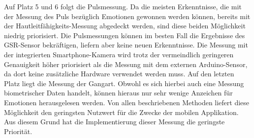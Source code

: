Auf Platz 5 und 6 folgt die Pulsmessung. Da die meisten Erkenntnisse, die mit der Messung des Puls bezüglich Emotionen gewonnen werden können, bereits mit der Hautleitfähigkeits-Messung abgedeckt werden, sind diese beiden Möglichkeit niedrig priorisiert. Die Pulsmessungen können im besten Fall die Ergebnisse des GSR-Sensor bekräftigen, liefern aber keine neuen Erkenntnisse. Die Messung mit der integrierten Smartphone-Kamera wird trotz der vermeindlich geringeren Genauigkeit höher priorisiert als die Messung mit dem externen Arduino-Sensor, da dort keine zusätzliche Hardware verwendet werden muss. \newline
Auf den letzten Platz liegt die Messung der Gangart. Obwohl es sich hierbei auch eine Messung biometrischer Daten handelt, können hieraus nur sehr wenige Anzeichen für Emotionen herausgelesen werden. Von allen beschriebenen Methoden liefert diese Möglichkeit den geringsten Nutzwert für die Zwecke der mobilen Applikation. Aus diesem Grund hat die Implementierung dieser Messung die geringste Priorität. \newline

